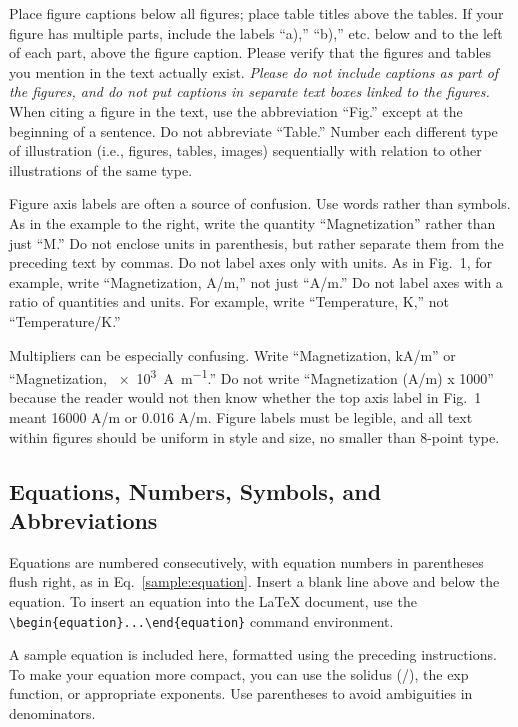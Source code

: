 \documentclass[conf]{new-aiaa}
\begin{document}
Place figure captions below all figures; place table titles above the tables. If your figure has multiple parts, include the labels ``a),'' ``b),'' etc. below and to the left of each part, above the figure caption. Please verify that the figures and tables you mention in the text actually exist. \emph{Please do not include captions as part of the figures, and do not put captions in separate text boxes linked to the figures.} When citing a figure in the text, use the abbreviation ``Fig.'' except at the beginning of a sentence. Do not abbreviate ``Table.'' Number each different type of illustration (i.e., figures, tables, images) sequentially with relation to other illustrations of the same type.

Figure axis labels are often a source of confusion. Use words rather than symbols. As in the example to the right, write the quantity ``Magnetization'' rather than just ``M.'' Do not enclose units in parenthesis, but rather separate them from the preceding text by commas. Do not label axes only with units. As in Fig.~1, for example, write ``Magnetization, \si[per-mode=symbol]{\ampere\per\meter},'' not just ``A/m.'' Do not label axes with a ratio of quantities and units. For example, write ``Temperature, K,'' not ``Temperature/K.''

Multipliers can be especially confusing. Write ``Magnetization, \si[per-mode=symbol]{\kilo\ampere\per\meter}'' or ``Magnetization, \SI[per-mode=symbol]{e3}{\ampere\per\meter}.'' Do not write ``Magnetization (A/m) x 1000'' because the reader would not then know whether the top axis label in Fig.~1 meant 16000 A/m or 0.016 A/m. Figure labels must be legible, and all text within figures should be uniform in style and size, no smaller than 8-point type.

\subsection{Equations, Numbers, Symbols, and Abbreviations}
Equations are numbered consecutively, with equation numbers in parentheses flush right, as in Eq.~\eqref{sample:equation}. Insert a blank line above and below the equation. To insert an equation into the \LaTeX{} document, use the \verb|\begin{equation}...\end{equation}| command environment.

A sample equation is included here, formatted using the preceding instructions. To make your equation more compact, you can use the solidus (/), the exp function, or appropriate exponents. Use parentheses to avoid ambiguities in denominators.
\end{document}
